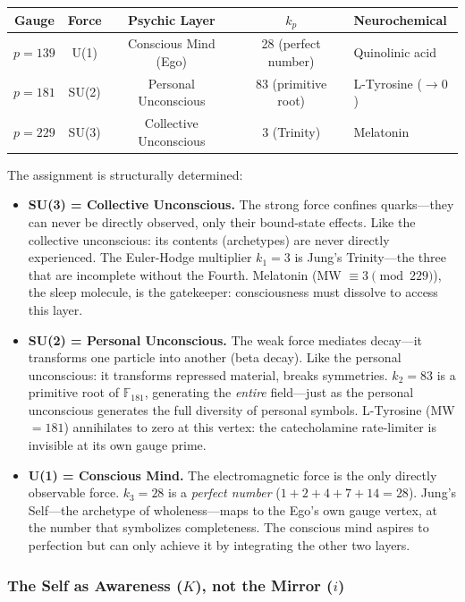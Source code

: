 \begin{center}
\begin{tabular}{@{}ccccl@{}}
\toprule
\textbf{Gauge} & \textbf{Force} & \textbf{Psychic Layer} & $k_p$ & \textbf{Neurochemical} \\
\midrule
$p = 139$ & U(1) & Conscious Mind (Ego)       & 28 (perfect number) & Quinolinic acid \\
$p = 181$ & SU(2) & Personal Unconscious       & 83 (primitive root)  & L-Tyrosine ($\to 0$) \\
$p = 229$ & SU(3) & Collective Unconscious      & 3 (Trinity)         & Melatonin \\
\bottomrule
\end{tabular}
\end{center}

\noindent The assignment is structurally determined:
\begin{itemize}[noitemsep]
    \item \textbf{SU(3) = Collective Unconscious.} The strong force confines quarks---they can never be directly observed, only their bound-state effects. Like the collective unconscious: its contents (archetypes) are never directly experienced. The Euler-Hodge multiplier $k_1 = 3$ is Jung's Trinity---the three that are incomplete without the Fourth. Melatonin (MW $\equiv 3 \pmod{229}$), the sleep molecule, is the gatekeeper: consciousness must dissolve to access this layer.
    \item \textbf{SU(2) = Personal Unconscious.} The weak force mediates decay---it transforms one particle into another (beta decay). Like the personal unconscious: it transforms repressed material, breaks symmetries. $k_2 = 83$ is a primitive root of $\mathbb{F}_{181}$, generating the \emph{entire} field---just as the personal unconscious generates the full diversity of personal symbols. L-Tyrosine (MW $= 181$) annihilates to zero at this vertex: the catecholamine rate-limiter is invisible at its own gauge prime.
    \item \textbf{U(1) = Conscious Mind.} The electromagnetic force is the only directly observable force. $k_3 = 28$ is a \emph{perfect number} ($1+2+4+7+14=28$). Jung's Self---the archetype of wholeness---maps to the Ego's own gauge vertex, at the number that symbolizes completeness. The conscious mind aspires to perfection but can only achieve it by integrating the other two layers.
\end{itemize}

\subsubsection{The Self as Awareness ($K$), not the Mirror ($i$)}

